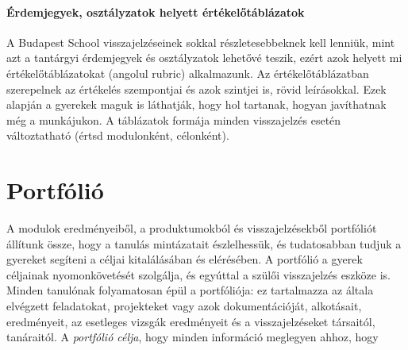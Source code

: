 \paragraph{Érdemjegyek, osztályzatok helyett értékelőtáblázatok} A Budapest School visszajelzéseinek sokkal részletesebbeknek kell lenniük, mint azt a tantárgyi érdemjegyek és osztályzatok lehetővé teszik, ezért azok helyett mi értékelőtáblázatokat (angolul rubric) alkalmazunk. Az értékelőtáblázatban szerepelnek az értékelés szempontjai és azok szintjei is, rövid leírásokkal. Ezek alapján a gyerekek maguk is láthatják, hogy hol tartanak, hogyan javíthatnak még a munkájukon. A táblázatok formája minden visszajelzés esetén változtatható (értsd modulonként, célonként).

\section{Portfólió}

A modulok eredményeiből, a produktumokból és visszajelzésekből portfóliót állítunk össze, hogy a tanulás mintázatait észlelhessük, és tudatosabban tudjuk a gyereket segíteni a céljai kitalálásában és elérésében. A portfólió a gyerek céljainak nyomonkövetését szolgálja, és egyúttal a szülői visszajelzés eszköze is. Minden tanulónak folyamatosan épül a portfóliója: ez tartalmazza az általa elvégzett feladatokat, projekteket vagy azok dokumentációját, alkotásait, eredményeit, az esetleges vizsgák eredményeit és a visszajelzéseket társaitól, tanáraitól. A \emph{portfólió célja}, hogy minden információ meglegyen ahhoz, hogy

